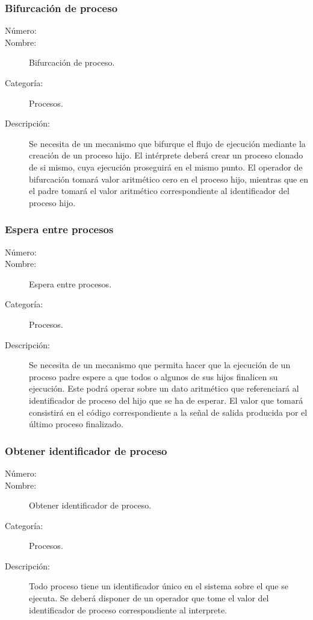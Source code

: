 \subsubsection{Bifurcación de proceso}
	\begin{description}
		\item [Número:] \cn
		\item [Nombre:] Bifurcación de proceso.
		\item [Categoría:] Procesos.
		\item [Descripción:] Se necesita de un mecanismo que bifurque el flujo de ejecución mediante la creación de un proceso hijo.
		El intérprete deberá crear un proceso clonado de si mismo, cuya ejecución proseguirá en el mismo punto. El operador 
		de bifurcación tomará valor aritmético cero en el proceso hijo, mientras que en el padre tomará el valor aritmético
		correspondiente al identificador del proceso hijo.    
	\end{description}

\subsubsection{Espera entre procesos}
	\begin{description}
		\item [Número:] \cn
		\item [Nombre:] Espera entre procesos.
		\item [Categoría:] Procesos.
		\item [Descripción:] Se necesita de un mecanismo que permita hacer que la ejecución de un proceso padre espere 
		a que todos o algunos de sus hijos finalicen su ejecución. Este podrá operar sobre un dato aritmético 
		que referenciará al identificador de proceso del hijo que se ha de esperar. El valor que tomará consistirá en
		el código correspondiente a la señal de salida producida por el último proceso finalizado.     
	\end{description}

\subsubsection{Obtener identificador de proceso}
	\begin{description}
		\item [Número:] \cn
		\item [Nombre:] Obtener identificador de proceso.
		\item [Categoría:] Procesos.
		\item [Descripción:] Todo proceso tiene un identificador único en el sistema sobre el que se ejecuta. Se deberá
		disponer de un operador que tome el valor del identificador de proceso correspondiente al interprete.     
	\end{description}

